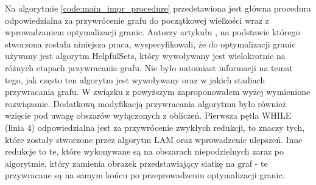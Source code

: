 \vspace{-8mm}
\label{code:main_impr_procedure}
\vspace{4mm}
Na algorytmie \ref{code:main_impr_procedure}
przedstawiona jest główna procedura odpowiedzialna za przywrócenie grafu do
początkowej wielkości wraz z wprowadzaniem optymalizacji granic.
Autorzy artykułu \cite{1364754}, na podstawie którego stworzona została niniejsza praca, wyspecyfikowali, że
do optymalizacji granic używany jest algorytm HelpfulSets, który
wywoływany jest wielokrotnie na różnych etapach przywracania grafu.
Nie było natomiast informacji na temat tego, jak często ten algorytm jest wywoływany oraz w jakich stadiach przywracania grafu.
W związku z powyższym zaproponowałem wyżej wymienione rozwiązanie.
Dodatkową modyfikacją przywracania algorytmu było również wzięcie pod uwagę obszarów wyłączonych z obliczeń.
Pierwsza pętla WHILE (linia $4$) odpowiedzialna jest za przywrócenie zwykłych
redukcji, to znaczy tych, które zostały stworzone przez algorytm LAM oraz wprowadzenie ulepszeń.
Inne redukcje to te, które wykonywane są na obszarach niepodzielnych zaraz po
algorytmie, który zamienia obrazek przedstawiający siatkę na graf - te przywracane są na samym końcu po przeprowadzeniu
optymalizacji granic.

